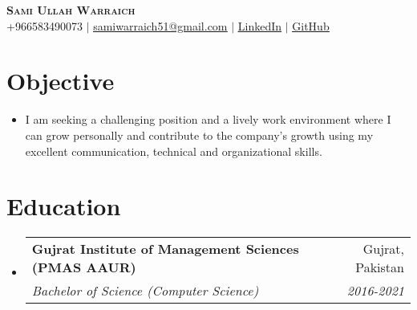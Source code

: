 \documentclass[letterpaper,11pt]{article}
\makeatletter
\newcommand{\resumeItem}[1]{
  \item\small{
    {#1 \vspace{-2pt}}
  }
}
\newcommand{\resumeSubheading}[4]{
  \vspace{-1pt}\item
    \begin{tabular*}{0.97\textwidth}[t]{l@{\extracolsep{\fill}}r}
      \textbf{#1} & #2 \\
      \textit{\small#3} & \textit{\small #4} \\
    \end{tabular*}\vspace{-6pt}
}
\newcommand{\resumeSubHeadingListStart}{\begin{itemize}[leftmargin=0.15in, label={}]}
\newcommand{\resumeSubHeadingListEnd}{\end{itemize}}
\newcommand{\resumeItemListStart}{\begin{itemize}}
\newcommand{\resumeItemListEnd}{\end{itemize}\vspace{-4pt}}
\makeatother
\begin{document}

\begin{center}
    \textbf{\Huge \scshape Sami Ullah Warraich} \\ \vspace{1pt}
    \small +966583490073 $|$ \href{mailto:samiwarraich51@gmail.com}{\underline{samiwarraich51@gmail.com}} $|$ 
    \href{https://linkedin.com/in/sami-warraich}{\underline{LinkedIn}} $|$
    \href{https://github.com/samiwarraich}{\underline{GitHub}} 
\end{center}



\section{Objective}
     \resumeItemListStart
        \resumeItem{I am seeking a challenging position and a lively work environment where I can grow personally and contribute to the company’s growth using my excellent communication, technical and organizational skills.}\vspace{-10pt}
    \resumeItemListEnd

\section{Education}
  \resumeSubHeadingListStart
    \resumeSubheading
      {Gujrat Institute of Management Sciences (PMAS AAUR)}{Gujrat, Pakistan}
      {Bachelor of Science (Computer Science)}{2016-2021}
  \resumeSubHeadingListEnd


\end{document}
